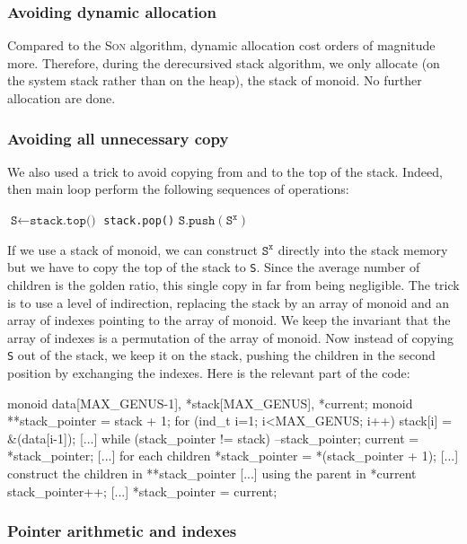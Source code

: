 \documentclass[reqno,11pt]{amsart}
\theoremstyle{plain}
\theoremstyle{definition}
\renewcommand{\tt}[1]{\texttt{#1}}
\begin{document}
\subsubsection*{Avoiding dynamic allocation} Compared to the \textsc{Son}
algorithm, dynamic allocation cost orders of magnitude more. Therefore, during
the derecursived stack algorithm, we only allocate (on the system stack rather
than on the heap), the stack of monoid. No further allocation are done.

\subsubsection*{Avoiding all unnecessary copy} We also used a trick to avoid
copying from and to the top of the stack. Indeed, then main loop perform the
following sequences of operations:
\begin{algorithmic}[1]
  \State $\tt{S} \gets \tt{stack.top()}$
  \State \tt{stack.pop()}
  \For{all children $\tt{S}^\tt{x}$ of \tt{S}}
  \State $\tt{S.push}(\tt{S}^\tt{x})$
  \EndFor
\end{algorithmic}
If we use a stack of monoid, we can construct $\tt{S}^\tt{x}$ directly into
the stack memory but we have to copy the top of the stack to \tt{S}. Since the
average number of children is the golden ratio, this single copy in far from
being negligible. The trick is to use a level of indirection, replacing the
stack by an array of monoid and an array of indexes pointing to the array of
monoid. We keep the invariant that the array of indexes is a permutation of
the array of monoid. Now instead of copying \tt{S} out of the stack, we keep
it on the stack, pushing the children in the second position by exchanging the
indexes. Here is the relevant part of the code:
\begin{listing}{1}
  monoid data[MAX_GENUS-1], *stack[MAX_GENUS], *current;
  monoid **stack_pointer = stack + 1;
  for (ind_t i=1; i<MAX_GENUS; i++) stack[i] = &(data[i-1]);
  [...]
  while (stack_pointer != stack) {
      --stack_pointer;
      current = *stack_pointer;
      [...] for each children {
        *stack_pointer = *(stack_pointer + 1);
        [...] construct the children in **stack_pointer
        [...] using the parent in *current
        stack_pointer++;
        [...]
      }
      *stack_pointer = current;
  }
\end{listing}

\subsubsection*{Pointer arithmetic and indexes}
\end{document}
